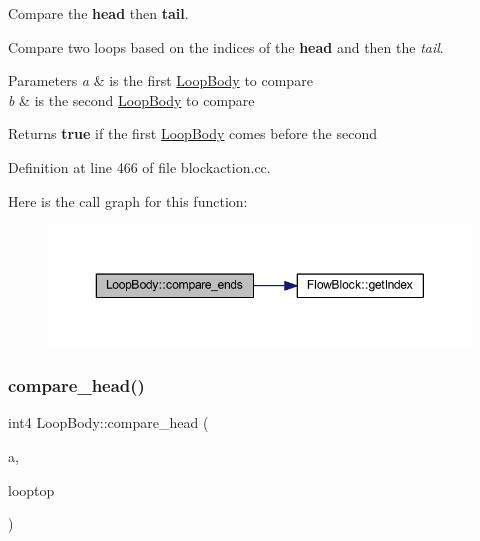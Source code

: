 Compare the {\bfseries{head}} then {\bfseries{tail}}. 

Compare two loops based on the indices of the {\bfseries{head}} and then the {\itshape tail}. 
\begin{DoxyParams}{Parameters}
{\em a} & is the first \mbox{\hyperlink{class_loop_body}{Loop\+Body}} to compare \\
\hline
{\em b} & is the second \mbox{\hyperlink{class_loop_body}{Loop\+Body}} to compare \\
\hline
\end{DoxyParams}
\begin{DoxyReturn}{Returns}
{\bfseries{true}} if the first \mbox{\hyperlink{class_loop_body}{Loop\+Body}} comes before the second 
\end{DoxyReturn}


Definition at line 466 of file blockaction.\+cc.

Here is the call graph for this function\+:
\nopagebreak
\begin{figure}[H]
\begin{center}
\leavevmode
\includegraphics[width=350pt]{class_loop_body_af92c183b5af2d39509af1148ffeb8acf_cgraph}
\end{center}
\end{figure}
\mbox{\label{class_loop_body_aa21c0bf7e110479ebeb1590c8ef58542}} 
\subsubsection{\texorpdfstring{compare\_head()}{compare\_head()}}
{\footnotesize\ttfamily int4 Loop\+Body\+::compare\+\_\+head (\begin{DoxyParamCaption}\item[{\mbox{\hyperlink{class_loop_body}{Loop\+Body}} $\ast$}]{a,  }\item[{\mbox{\hyperlink{class_flow_block}{Flow\+Block}} $\ast$}]{looptop }\end{DoxyParamCaption})\hspace{0.3cm}{\ttfamily [static]}}



